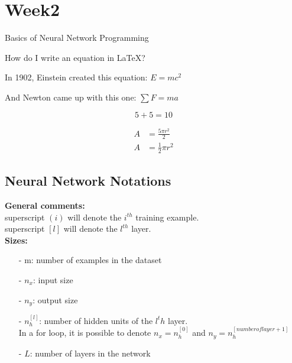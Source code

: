 \documentclass{article}
\begin{document}
\newpage

\section{Week2}

Basics of Neural Network Programming

How do I write an equation in \LaTeX?\\

\begin{center}
\end{center}

In 1902, Einstein created this equation: $E=mc^2$

And Newton came up with this one: $\sum F=ma$

\begin{equation}
    5+5=10
\end{equation}

\begin{equation}
    \begin{split}
        A & = \frac{5\pi r^2}{2} \\
        A & = \frac{1}{2} \pi r^2
    \end{split}
\end{equation}

\newpage

\subsection{Neural Network Notations}

\textbf{General comments:}\\
superscript $(i)$ will denote the $i^{th}$ training example. \\
superscript $[l]$ will denote the $l^{th}$ layer.\\

\textbf{Sizes:}
\begin{itemize}
    \item[-]{m: number of examples in the dataset}
    \item[-]{$n_x$: input size}
    \item[-]{$n_y$: output size}
    \item[-]{$n_h^{[l]}$: number of hidden units of the ${l^th}$ layer. \\ In a for loop, it is possible to denote $n_x = n_h^{[0]}$ and $n_y = n_h^{[number of layer+1]}$ }
    \item[-]{$L$: number of layers in the network}
\end{itemize}
\end{document}
